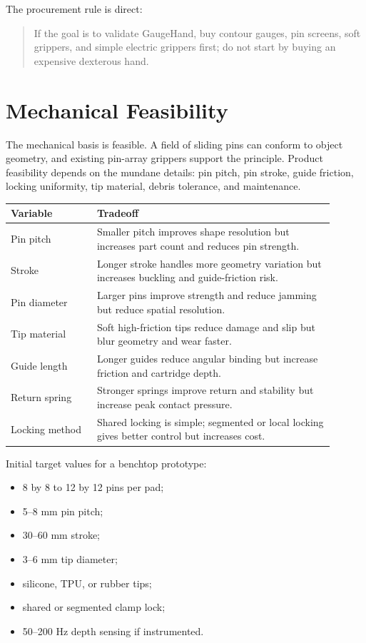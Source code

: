 \documentclass[11pt]{article}
\begin{document}
The procurement rule is direct:

\begin{quote}
If the goal is to validate GaugeHand, buy contour gauges, pin screens, soft grippers, and simple electric grippers first; do not start by buying an expensive dexterous hand.
\end{quote}

\section{Mechanical Feasibility}

The mechanical basis is feasible. A field of sliding pins can conform to object geometry, and existing pin-array grippers support the principle. Product feasibility depends on the mundane details: pin pitch, pin stroke, guide friction, locking uniformity, tip material, debris tolerance, and maintenance.

\begin{longtable}{L{0.24\linewidth} L{0.66\linewidth}}
\toprule
\textbf{Variable} & \textbf{Tradeoff} \\
\midrule
\endhead
Pin pitch & Smaller pitch improves shape resolution but increases part count and reduces pin strength. \\
Stroke & Longer stroke handles more geometry variation but increases buckling and guide-friction risk. \\
Pin diameter & Larger pins improve strength and reduce jamming but reduce spatial resolution. \\
Tip material & Soft high-friction tips reduce damage and slip but blur geometry and wear faster. \\
Guide length & Longer guides reduce angular binding but increase friction and cartridge depth. \\
Return spring & Stronger springs improve return and stability but increase peak contact pressure. \\
Locking method & Shared locking is simple; segmented or local locking gives better control but increases cost. \\
\bottomrule
\end{longtable}

Initial target values for a benchtop prototype:

\begin{itemize}
  \item 8 by 8 to 12 by 12 pins per pad;
  \item 5--8 mm pin pitch;
  \item 30--60 mm stroke;
  \item 3--6 mm tip diameter;
  \item silicone, TPU, or rubber tips;
  \item shared or segmented clamp lock;
  \item 50--200 Hz depth sensing if instrumented.
\end{itemize}
\end{document}
